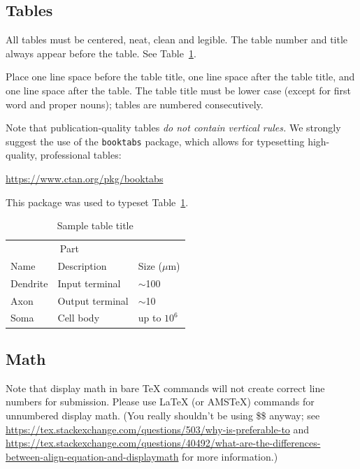 \documentclass{article}
\begin{document}
\subsection{Tables}


All tables must be centered, neat, clean and legible.  The table number and
title always appear before the table.  See Table~\ref{sample-table}.


Place one line space before the table title, one line space after the
table title, and one line space after the table. The table title must
be lower case (except for first word and proper nouns); tables are
numbered consecutively.


Note that publication-quality tables \emph{do not contain vertical rules.} We
strongly suggest the use of the \verb+booktabs+ package, which allows for
typesetting high-quality, professional tables:
\begin{center}
  \url{https://www.ctan.org/pkg/booktabs}
\end{center}
This package was used to typeset Table~\ref{sample-table}.


\begin{table}
  \caption{Sample table title}
  \label{sample-table}
  \centering
  \begin{tabular}{lll}
    \toprule
    \multicolumn{2}{c}{Part}                   \\
    \cmidrule(r){1-2}
    Name     & Description     & Size ($\mu$m) \\
    \midrule
    Dendrite & Input terminal  & $\sim$100     \\
    Axon     & Output terminal & $\sim$10      \\
    Soma     & Cell body       & up to $10^6$  \\
    \bottomrule
  \end{tabular}
\end{table}

\subsection{Math}
Note that display math in bare TeX commands will not create correct line numbers for submission. Please use LaTeX (or AMSTeX) commands for unnumbered display math. (You really shouldn't be using \$\$ anyway; see \url{https://tex.stackexchange.com/questions/503/why-is-preferable-to} and \url{https://tex.stackexchange.com/questions/40492/what-are-the-differences-between-align-equation-and-displaymath} for more information.)
\end{document}
